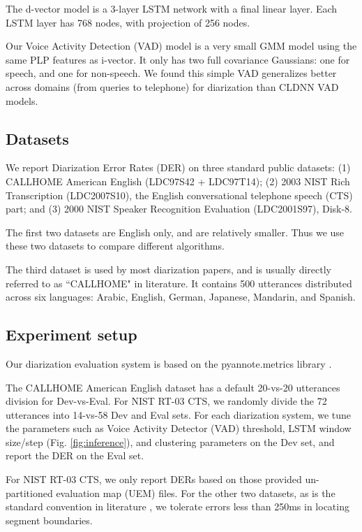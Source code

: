 \documentclass{article}
\begin{document}
The d-vector model is a 3-layer LSTM network with a final linear layer. Each LSTM layer has
768 nodes, with projection \cite{sak2014long} of 256 nodes.

Our Voice Activity Detection (VAD) model is a very small GMM model using the same PLP features
as i-vector. It only has two full covariance Gaussians:
one for speech, and one for non-speech. We found this simple VAD generalizes better
across domains (from queries to telephone) for diarization than
CLDNN \cite{zazo2016feature} VAD models.

\subsection{Datasets}
We report Diarization Error Rates (DER) on three standard public datasets:
(1) CALLHOME American English \cite{canavan1997callhome} (LDC97S42 + LDC97T14);
(2) 2003 NIST Rich Transcription (LDC2007S10),
the English conversational telephone speech (CTS) part;
and (3) 2000 NIST Speaker Recognition Evaluation (LDC2001S97), Disk-8.

The first two datasets are English only, and are relatively smaller. Thus we use these two datasets to compare different algorithms.

The third dataset is used by most diarization papers, and is usually directly referred to as ``CALLHOME" in literature. It contains 500 utterances distributed across six languages: Arabic, English, German, Japanese, Mandarin, and Spanish.

\subsection{Experiment setup}

Our diarization evaluation system is based on the pyannote.metrics library \cite{bredin2017pyannote}.


The CALLHOME American English dataset has a default 20-vs-20 utterances division for Dev-vs-Eval. For NIST RT-03 CTS,
we randomly divide the 72 utterances into 14-vs-58 Dev and Eval sets.
For each diarization system,
we tune the parameters such as Voice Activity Detector (VAD) threshold,
LSTM window size/step (Fig. \ref{fig:inference}), and clustering parameters on the Dev
set, and report the DER on the Eval set.

For NIST RT-03 CTS,
we only report DERs based on those provided un-partitioned evaluation map (UEM) files.
For the other two datasets, as is the standard convention in literature
\cite{castaldo2008stream,shum2013unsupervised,senoussaoui2014study,sell2015diarization,garcia2017speaker,zajic2017speaker},
we tolerate errors less than 250ms in locating segment boundaries. 
\end{document}
